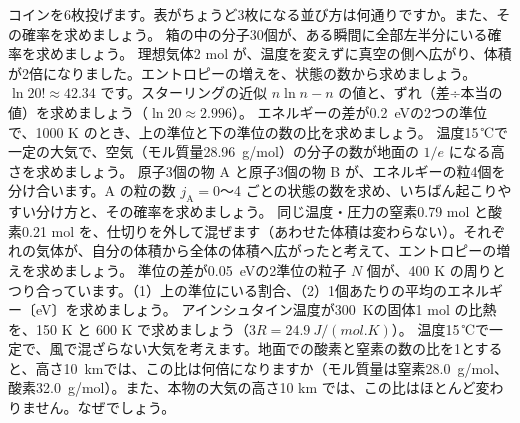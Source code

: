 \bkendproblems
{}
\bkproblem コインを6枚投げます。表がちょうど3枚になる並び方は何通りですか。また、その確率を求めましょう。
\bkproblem 箱の中の分子30個が、ある瞬間に全部左半分にいる確率を求めましょう。
\bkproblem 理想気体2 mol が、温度を変えずに真空の側へ広がり、体積が2倍になりました。エントロピーの増えを、状態の数から求めましょう。
\bkproblem $\ln20!\approx42.34$ です。スターリングの近似 $n\ln n-n$ の値と、ずれ（差÷本当の値）を求めましょう（$\ln20\approx2.996$）。
\bkproblem エネルギーの差が\qty{0.2}{eV}の2つの準位で、1000 K のとき、上の準位と下の準位の数の比を求めましょう。
\bkproblem 温度15\,℃で一定の大気で、空気（モル質量\qty{28.96}{g/mol}）の分子の数が地面の $1/e$ になる高さを求めましょう。
\bkproblem 原子3個の物 A と原子3個の物 B が、エネルギーの粒4個を分け合います。A の粒の数 $j_{\mathrm A}=0$〜4 ごとの状態の数を求め、いちばん起こりやすい分け方と、その確率を求めましょう。
\bkproblem 同じ温度・圧力の窒素0.79 mol と酸素0.21 mol を、仕切りを外して混ぜます（あわせた体積は変わらない）。それぞれの気体が、自分の体積から全体の体積へ広がったと考えて、エントロピーの増えを求めましょう。
\bkproblem 準位の差が\qty{0.05}{eV}の2準位の粒子 $N$ 個が、400 K の周りとつり合っています。（1）上の準位にいる割合、（2）1個あたりの平均のエネルギー〔eV〕を求めましょう。
\bkproblem アインシュタイン温度が\qty{300}{K}の固体1 mol の比熱を、150 K と 600 K で求めましょう（$3R=\qty{24.9}{J/(mol.K)}$）。
\bkproblem 温度15\,℃で一定で、風で混ざらない大気を考えます。地面での酸素と窒素の数の比を1とすると、高さ\qty{10}{km}では、この比は何倍になりますか（モル質量は窒素\qty{28.0}{g/mol}、酸素\qty{32.0}{g/mol}）。また、本物の大気の高さ10 km では、この比はほとんど変わりません。なぜでしょう。
